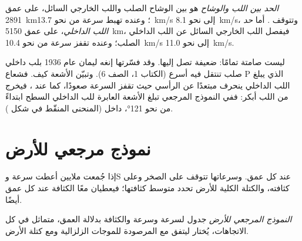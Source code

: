 \begin{definition}\label{def:g11:seismic-structure:core}
\emph{الحد بين اللب والوشاح} هو  بين الوشاح الصلب واللب الخارجي السائل، على عمق
\qty{2891}{km}؛ وعنده تهبط سرعة  من نحو \qty{13.7}{km/s} إلى
نحو \qty{8.1}{km/s}، وتتوقف . أما \emph{حد اللب
الداخلي}، على عمق \qty{5150}{km}، فيفصل
اللب الخارجي السائل عن اللب الداخلي الصلب؛ وعنده تقفز سرعة  من
نحو \qty{10.4}{km/s} إلى نحو \qty{11.0}{km/s}.
\end{definition}

ليست  صامتة تمامًا:  ضعيفة تصل إليها. وقد فسّرتها إنغه
ليمان عام 1936 بلب داخلي صلب تنتقل فيه 
أسرع (الكتاب 1، الصف 6). وتبيّن الأشعة كيف. فشعاع P الذي يبلغ
اللب الداخلي ينحرف مبتعدًا عن الرأسي حيث تقفز السرعة صعودًا، كما عند
، فيخرج من اللب أبكر: ففي النموذج المرجعي تبلغ الأشعة
العابرة للب الداخلي السطح ابتداءً من نحو \ang{121}، داخل
 (المنحنى المنقّط في شكل ).

\section{نموذج مرجعي للأرض}\label{sec:g11:seismic-structure:model}

إذا جُمعت ملايين  أعطت سرعة  وS عند
كل عمق. وسرعاتها تتوقف على الصخر وعلى كثافته، والكتلة
الكلية للأرض تحدد متوسط كثافتها؛ فيعطيان معًا
الكثافة عند كل عمق أيضًا.

\begin{definition}\label{def:g11:seismic-structure:reference-model}
\emph{النموذج المرجعي للأرض} جدول
لسرعة  وسرعة  والكثافة بدلالة العمق، متماثل
في كل الاتجاهات، يُختار ليتفق مع  المرصودة
للموجات الزلزالية ومع كتلة الأرض.
\end{definition}

